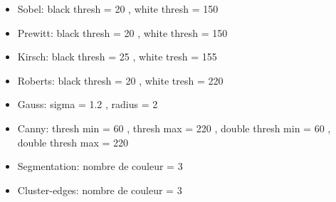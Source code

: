 \documentclass[twoside,openright,a4paper,11pt,french]{article}
\begin{document}
\begin{itemize}
\item Sobel: black thresh = 20 , white thresh = 150
\item Prewitt: black thresh = 20 , white thresh = 150
\item Kirsch: black thresh = 25 , white tresh = 155
\item Roberts: black thresh = 20 , white tresh = 220
\item Gauss: sigma = 1.2 , radius = 2
\item Canny: thresh min = 60 , thresh max = 220 , double thresh min = 60 , double thresh max = 220
\item Segmentation: nombre de couleur = 3
\item Cluster-edges: nombre de couleur = 3
\end{itemize}



\end{document}
